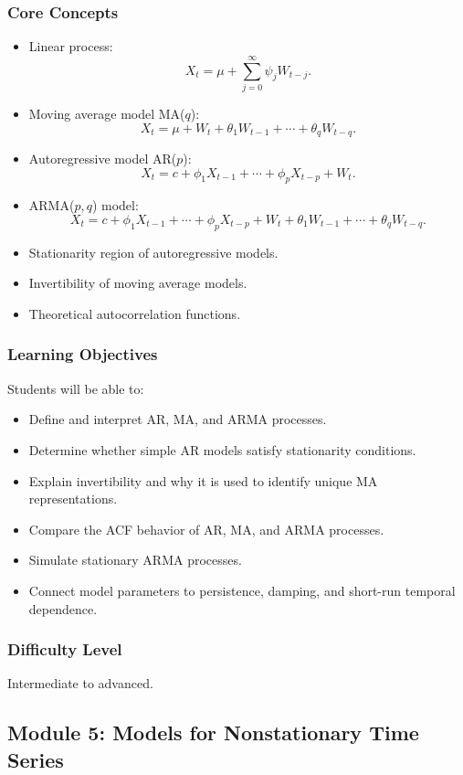 \documentclass[11pt]{article}
\begin{document}
\subsubsection*{Core Concepts}
\begin{itemize}
    \item Linear process:
    \[
        X_t = \mu + \sum_{j=0}^{\infty}\psi_j W_{t-j}.
    \]
    \item Moving average model MA($q$):
    \[
        X_t = \mu + W_t + \theta_1W_{t-1} + \cdots + \theta_qW_{t-q}.
    \]
    \item Autoregressive model AR($p$):
    \[
        X_t = c + \phi_1X_{t-1} + \cdots + \phi_pX_{t-p} + W_t.
    \]
    \item ARMA($p,q$) model:
    \[
        X_t = c + \phi_1X_{t-1} + \cdots + \phi_pX_{t-p}
        + W_t + \theta_1W_{t-1} + \cdots + \theta_qW_{t-q}.
    \]
    \item Stationarity region of autoregressive models.
    \item Invertibility of moving average models.
    \item Theoretical autocorrelation functions.
\end{itemize}

\subsubsection*{Learning Objectives}
Students will be able to:
\begin{itemize}
    \item Define and interpret AR, MA, and ARMA processes.
    \item Determine whether simple AR models satisfy stationarity conditions.
    \item Explain invertibility and why it is used to identify unique MA representations.
    \item Compare the ACF behavior of AR, MA, and ARMA processes.
    \item Simulate stationary ARMA processes.
    \item Connect model parameters to persistence, damping, and short-run temporal dependence.
\end{itemize}

\subsubsection*{Difficulty Level}
Intermediate to advanced.

\subsection{Module 5: Models for Nonstationary Time Series}
\end{document}
